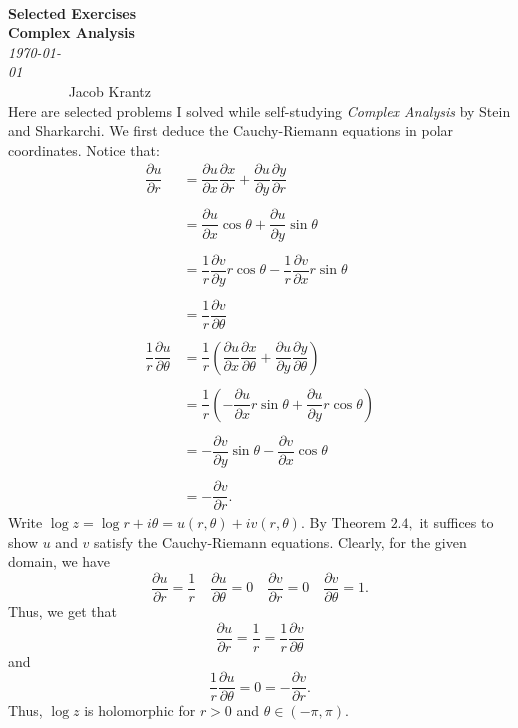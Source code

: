 \documentclass[12pt]{article}
\newenvironment{statement}[1]{\smallskip\noindent\color{black}{\bf #1.}}{}
\theoremstyle{definition}
\theoremstyle{remark}
\newcommand{\p}{\partial}
\begin{document}
{\noindent\Huge\bf  \\[0.5\baselineskip] {\selectfont  Selected Exercises}         }\\[1\baselineskip] %
{ {\bf {}\selectfont Complex Analysis}\\ {\textit{\selectfont     \today}}}~~~~~~~~~~~~~~~~~~~~~~~~~~~~~~~~~~~~~~~~~~~~~~~~~~~~~~~~~~~~~~~~~~~~~~~~~~~~~    {\large{Jacob Krantz}}
\noindent\makebox[\linewidth]{\rule{8in}{0.4pt}}
\\[1.4\baselineskip]
Here are selected problems I solved while self-studying \textit{Complex Analysis} by Stein and Sharkarchi.
\begin{statement}{1.9}
We first deduce the Cauchy-Riemann equations in polar coordinates. Notice that:
\begin{align*}
\dfrac{\p u}{\p r} &= \dfrac{\p u}{\p x}\dfrac{\p x}{\p r} + \dfrac{\p u}{\p y}\dfrac{\p y}{\p r} \\\\
&= \dfrac{\p u}{\p x}\cos\theta + \dfrac{\p u}{\p y}\sin\theta \\\\
&= \dfrac{1}{r}\dfrac{\p v}{\p y}r\cos\theta - \dfrac{1}{r}\dfrac{\p v}{\p x}r\sin\theta \\\\
&= \dfrac{1}{r}\dfrac{\p v}{\p \theta} \\\\
\dfrac{1}{r}\dfrac{\p u}{\p \theta} &= \dfrac{1}{r}\left (\dfrac{\p u}{\p x}\dfrac{\p x}{\p \theta} + \dfrac{\p u}{\p y}\dfrac{\p y}{\p \theta}\right ) \\\\
&= \dfrac{1}{r}\left (-\dfrac{\p u}{\p x}r\sin\theta + \dfrac{\p u}{\p y}r\cos\theta\right ) \\\\
&= -\dfrac{\p v}{\p y}\sin\theta - \dfrac{\p v}{\p x}\cos\theta \\\\
&= -\dfrac{\p v}{\p r}.
\end{align*}
Write $\log z = \log r + i\theta = u(r,\theta) + iv(r,\theta).$ By Theorem $2.4,$ it suffices to show $u$ and $v$ satisfy the Cauchy-Riemann equations. Clearly, for the given domain, we have
\[\dfrac{\p u}{\p r} = \dfrac{1}{r} \quad \dfrac{\p u}{\p \theta} = 0 \quad \dfrac{\p v}{\p r} = 0 \quad \dfrac{\p v}{\p \theta} = 1.\]
Thus, we get that
\[\dfrac{\p u}{\p r} = \dfrac{1}{r} = \dfrac{1}{r}\dfrac{\p v}{\p \theta}\]
and
\[\dfrac{1}{r}\dfrac{\p u}{\p \theta} = 0 = -\dfrac{\p v}{\p r}.\]
Thus, $\log z$ is holomorphic for $r > 0$ and $\theta \in (-\pi,\pi).$
\end{statement}
\end{document}
